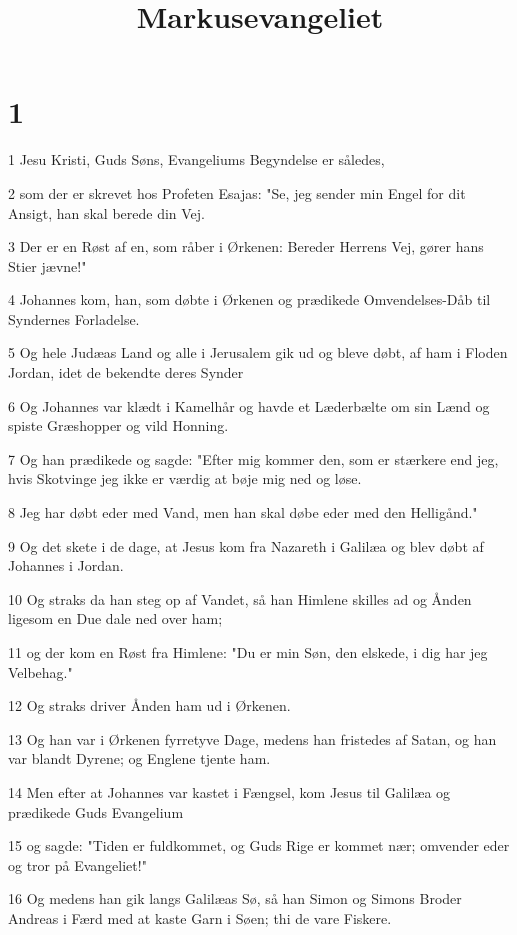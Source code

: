 

\title{Markusevangeliet}


\chapter{1}

\par 1 Jesu Kristi, Guds Søns, Evangeliums Begyndelse er således,
\par 2 som der er skrevet hos Profeten Esajas: "Se, jeg sender min Engel for dit Ansigt, han skal berede din Vej.
\par 3 Der er en Røst af en, som råber i Ørkenen: Bereder Herrens Vej, gører hans Stier jævne!"
\par 4 Johannes kom, han, som døbte i Ørkenen og prædikede Omvendelses-Dåb til Syndernes Forladelse.
\par 5 Og hele Judæas Land og alle i Jerusalem gik ud og bleve døbt, af ham i Floden Jordan, idet de bekendte deres Synder
\par 6 Og Johannes var klædt i Kamelhår og havde et Læderbælte om sin Lænd og spiste Græshopper og vild Honning.
\par 7 Og han prædikede og sagde: "Efter mig kommer den, som er stærkere end jeg, hvis Skotvinge jeg ikke er værdig at bøje mig ned og løse.
\par 8 Jeg har døbt eder med Vand, men han skal døbe eder med den Helligånd."
\par 9 Og det skete i de dage, at Jesus kom fra Nazareth i Galilæa og blev døbt af Johannes i Jordan.
\par 10 Og straks da han steg op af Vandet, så han Himlene skilles ad og Ånden ligesom en Due dale ned over ham;
\par 11 og der kom en Røst fra Himlene: "Du er min Søn, den elskede, i dig har jeg Velbehag."
\par 12 Og straks driver Ånden ham ud i Ørkenen.
\par 13 Og han var i Ørkenen fyrretyve Dage, medens han fristedes af Satan, og han var blandt Dyrene; og Englene tjente ham.
\par 14 Men efter at Johannes var kastet i Fængsel, kom Jesus til Galilæa og prædikede Guds Evangelium
\par 15 og sagde: "Tiden er fuldkommet, og Guds Rige er kommet nær; omvender eder og tror på Evangeliet!"
\par 16 Og medens han gik langs Galilæas Sø, så han Simon og Simons Broder Andreas i Færd med at kaste Garn i Søen; thi de vare Fiskere.
